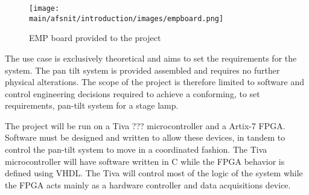 \documentclass[../../main]{subfiles}
\begin{document}
\begin{figure}[H]
\texttt{[image: \\main/afsnit/introduction/images/empboard.png]}
\caption{EMP board provided to the project}
\label{fig:empboard}
\end{figure}

The use case is exclusively theoretical and aims to set the requirements for the system.
The pan tilt system is provided assembled and requires no further physical alterations. The scope of the project is therefore limited to software and control engineering decisions required to achieve a conforming, to set requirements, pan-tilt system for a stage lamp.

The project will be run on a Tiva ??? microcontroller and a Artix-7 FPGA. Software must be designed and written to allow these devices, in tandem to control the pan-tilt system to move in a coordinated fashion. 
The Tiva microcontroller will have software written in C while the FPGA behavior is defined using VHDL. The Tiva will control most of the logic of the system while the FPGA acts mainly as a hardware controller and data acquisitions device. 
\end{document}
